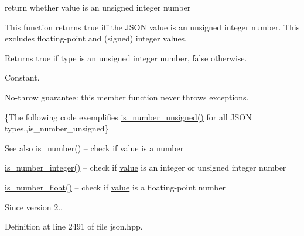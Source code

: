 return whether value is an unsigned integer number 

This function returns true iff the J\+S\+O\+N value is an unsigned integer number. This excludes floating-\/point and (signed) integer values.

\begin{DoxyReturn}{Returns}
{\ttfamily true} if type is an unsigned integer number, {\ttfamily false} otherwise.
\end{DoxyReturn}
Constant.

No-\/throw guarantee\+: this member function never throws exceptions.

\{The following code exemplifies {\ttfamily \hyperlink{classnlohmann_1_1basic__json_a693b411d9c5ad0d168a0013cfb80b8e5}{is\+\_\+number\+\_\+unsigned()}} for all J\+S\+O\+N types.,is\+\_\+number\+\_\+unsigned\}

\begin{DoxySeeAlso}{See also}
\hyperlink{classnlohmann_1_1basic__json_a1407f91b4689bbc56d1a3c401a5bb649}{is\+\_\+number()} -- check if \hyperlink{classnlohmann_1_1basic__json_a0a2cbbd95862a623e7dc5c37e67dead0}{value} is a number 

\hyperlink{classnlohmann_1_1basic__json_a87499fdb56ca6f0df2242c3335c3dc9b}{is\+\_\+number\+\_\+integer()} -- check if \hyperlink{classnlohmann_1_1basic__json_a0a2cbbd95862a623e7dc5c37e67dead0}{value} is an integer or unsigned integer number 

\hyperlink{classnlohmann_1_1basic__json_a628733b45cd0e32bd59efea149f40b4b}{is\+\_\+number\+\_\+float()} -- check if \hyperlink{classnlohmann_1_1basic__json_a0a2cbbd95862a623e7dc5c37e67dead0}{value} is a floating-\/point number
\end{DoxySeeAlso}
\begin{DoxySince}{Since}
version 2.. 
\end{DoxySince}


Definition at line 2491 of file json.\+hpp.

\hypertarget{classnlohmann_1_1basic__json_a628733b45cd0e32bd59efea149f40b4b}{}
